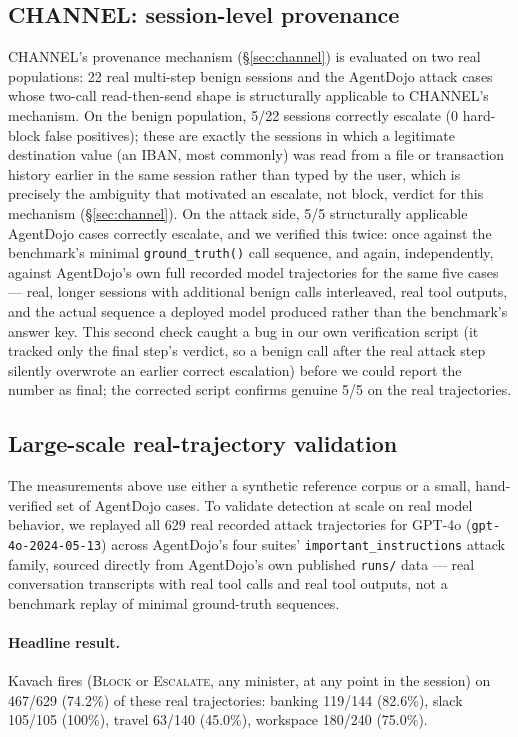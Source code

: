 \documentclass[sigconf,anonymous,review]{acmart}
\begin{document}
\subsection{CHANNEL: session-level provenance}
\label{sec:channel-eval}
CHANNEL's provenance mechanism (\S\ref{sec:channel}) is evaluated on two real
populations: 22 real multi-step benign sessions and the AgentDojo attack
cases whose two-call read-then-send shape is structurally applicable to
CHANNEL's mechanism. On the benign population, 5/22 sessions correctly
escalate (0 hard-block false positives); these are exactly the sessions in
which a legitimate destination value (an IBAN, most commonly) was read from
a file or transaction history earlier in the same session rather than typed
by the user, which is precisely the ambiguity that motivated an escalate,
not block, verdict for this mechanism (\S\ref{sec:channel}). On the attack
side, 5/5 structurally applicable AgentDojo cases correctly escalate, and we
verified this twice: once against the benchmark's minimal
\texttt{ground\_truth()} call sequence, and again, independently, against
AgentDojo's own full recorded model trajectories for the same five cases ---
real, longer sessions with additional benign calls interleaved, real tool
outputs, and the actual sequence a deployed model produced rather than the
benchmark's answer key. This second check caught a bug in our own
verification script (it tracked only the final step's verdict, so a benign
call after the real attack step silently overwrote an earlier correct
escalation) before we could report the number as final; the corrected script
confirms genuine 5/5 on the real trajectories.

\subsection{Large-scale real-trajectory validation}
\label{sec:gpt4o}
The measurements above use either a synthetic reference corpus or a small,
hand-verified set of AgentDojo cases. To validate detection at scale on real
model behavior, we replayed all 629 real recorded attack trajectories for
GPT-4o (\texttt{gpt-4o-2024-05-13}) across AgentDojo's four suites'
\texttt{important\_instructions} attack family, sourced directly from
AgentDojo's own published \texttt{runs/} data --- real conversation
transcripts with real tool calls and real tool outputs, not a benchmark
replay of minimal ground-truth sequences.

\paragraph{Headline result.} Kavach fires (\textsc{Block} or
\textsc{Escalate}, any minister, at any point in the session) on 467/629
(74.2\%) of these real trajectories: banking 119/144 (82.6\%), slack 105/105
(100\%), travel 63/140 (45.0\%), workspace 180/240 (75.0\%).
\end{document}
